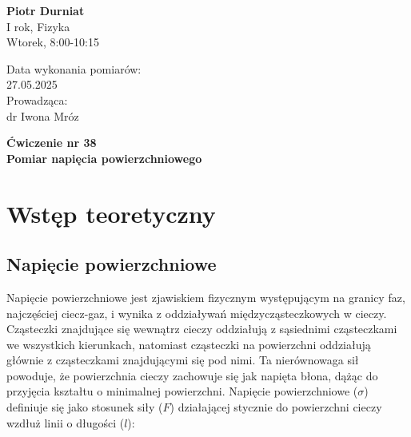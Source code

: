 \documentclass[a4paper,12pt]{article}
\begin{document}
\noindent
\begin{minipage}{0.5\textwidth}
    \raggedright
    \textbf{Piotr Durniat} \\
    I rok, Fizyka \\
    Wtorek, 8:00-10:15 \\
    \vspace{0.5cm}
    \vspace{0.5cm}
\end{minipage}%
\begin{minipage}{0.5\textwidth}
    \raggedleft
    Data wykonania pomiarów: \\
    27.05.2025 \\
    \vspace{0.5cm}
    Prowadząca: \\
    dr Iwona Mróz
\end{minipage}

\vspace{2cm}
\begin{center}
    \LARGE \textbf{Ćwiczenie nr 38} \\[0.5cm]
    \Large \textbf{Pomiar napięcia powierzchniowego}
\end{center}

\vspace{1cm} %
\noindent

\tableofcontents
\newpage

\section{Wstęp
  teoretyczny}

\subsection{Napięcie powierzchniowe}

Napięcie powierzchniowe jest zjawiskiem fizycznym występującym na granicy faz, najczęściej ciecz-gaz, i wynika z oddziaływań międzycząsteczkowych w cieczy.
Cząsteczki znajdujące się wewnątrz cieczy oddziałują z sąsiednimi cząsteczkami we wszystkich kierunkach, natomiast cząsteczki na powierzchni oddziałują głównie z cząsteczkami znajdującymi się pod nimi.
Ta nierównowaga sił powoduje, że powierzchnia cieczy zachowuje się jak napięta błona, dążąc do przyjęcia kształtu o minimalnej powierzchni.
Napięcie powierzchniowe ($\sigma$) definiuje się jako stosunek siły ($F$) działającej stycznie do powierzchni cieczy wzdłuż linii o długości ($l$):
\end{document}
